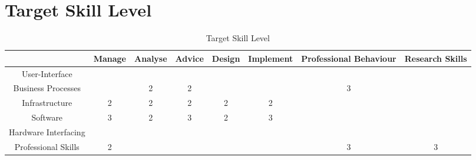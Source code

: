 
\section{Target Skill Level}
\label{sec:target}


\begin{table}[H]
	\centering
	\begin{tabular}{|c|c|c|c|c|c|c|c|}
		\hline
								& Manage 	& Analyse 	& Advice 	& Design 	& Implement 	& Professional Behaviour 	& Research Skills \\ \hline
		User-Interface 			& 			& 			& 			& 			& 	 			& 							& \\ \hline
		Business Processes 		& 			& 2			& 2 		& 			& 				& \cellcolor[HTML]{FD6864}3 						& \\ \hline
		Infrastructure 			& 2			& 2 		& 2			& 2 		& 2 			& 							& \\ \hline
		Software 				& 3 		& 2 		& \cellcolor[HTML]{FD6864}3 		& 2 		& \cellcolor[HTML]{FD6864}3 			& 							& \\ \hline
		Hardware Interfacing 	& 			& 			& 			& 			& 				& 							& \\ \hline
		Professional Skills 	& 2			& 			& 			& 			& 				& \cellcolor[HTML]{FD6864}3 						& \cellcolor[HTML]{FD6864}3 \\ \hline          
	\end{tabular}
	\caption{Target Skill Level}
	\label{targetskills}
\end{table}